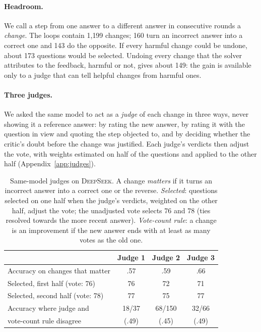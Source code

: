 \documentclass[11pt]{article}
\newcommand{\ds}{\textsc{DeepSeek}}
\begin{document}
\paragraph{Headroom.}
We call a step from one answer to a different answer in consecutive rounds a \emph{change}.
The loops contain 1{,}199 changes; 160 turn an incorrect answer into a correct one and 143 do the opposite.
If every harmful change could be undone, about 173 questions would be selected.
Undoing every change that the solver attributes to the feedback, harmful or not, gives about 149: the gain is available only to a judge that can tell helpful changes from harmful ones.

\paragraph{Three judges.}
We asked the same model to act as a \emph{judge} of each change in three ways, never showing it a reference answer: by rating the new answer, by rating it with the question in view and quoting the step objected to, and by deciding whether the critic's doubt before the change was justified.
Each judge's verdicts then adjust the vote, with weights estimated on half of the questions and applied to the other half (Appendix~\ref{app:judges}).

\begin{table}[t]
\centering
\small
\setlength{\tabcolsep}{3.5pt}
\begin{tabular}{@{}l ccc@{}}
\toprule
 & Judge 1 & Judge 2 & Judge 3 \\
\midrule
Accuracy on changes that matter & .57 & .59 & .66 \\
Selected, first half (vote: 76) & 76 & 72 & 71 \\
Selected, second half (vote: 78) & 77 & 75 & 77 \\
Accuracy where judge and & 18/37 & 68/150 & 32/66 \\
\quad vote-count rule disagree & (.49) & (.45) & (.49) \\
\bottomrule
\end{tabular}
\caption{Same-model judges on \ds. A change \emph{matters} if it turns an incorrect answer into a correct one or the reverse. \emph{Selected}: questions selected on one half when the judge's verdicts, weighted on the other half, adjust the vote; the unadjusted vote selects 76 and 78 (ties resolved towards the more recent answer). \emph{Vote-count rule}: a change is an improvement if the new answer ends with at least as many votes as the old one.}
\label{tab:judges}
\end{table}
\end{document}
